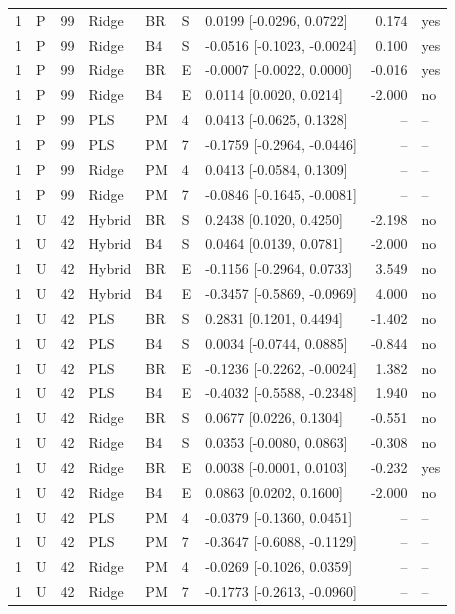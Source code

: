 \documentclass[10pt,a4paper]{article}
\begin{document}
\begin{longtable}{rlrllllrl}
1 & P & 99 & Ridge & BR & S & 0.0199 [-0.0296, 0.0722] & 0.174 & yes \\
1 & P & 99 & Ridge & B4 & S & -0.0516 [-0.1023, -0.0024] & 0.100 & yes \\
1 & P & 99 & Ridge & BR & E & -0.0007 [-0.0022, 0.0000] & -0.016 & yes \\
1 & P & 99 & Ridge & B4 & E & 0.0114 [0.0020, 0.0214] & -2.000 & no \\
1 & P & 99 & PLS & PM & 4 & 0.0413 [-0.0625, 0.1328] & -- & -- \\
1 & P & 99 & PLS & PM & 7 & -0.1759 [-0.2964, -0.0446] & -- & -- \\
1 & P & 99 & Ridge & PM & 4 & 0.0413 [-0.0584, 0.1309] & -- & -- \\
1 & P & 99 & Ridge & PM & 7 & -0.0846 [-0.1645, -0.0081] & -- & -- \\
1 & U & 42 & Hybrid & BR & S & 0.2438 [0.1020, 0.4250] & -2.198 & no \\
1 & U & 42 & Hybrid & B4 & S & 0.0464 [0.0139, 0.0781] & -2.000 & no \\
1 & U & 42 & Hybrid & BR & E & -0.1156 [-0.2964, 0.0733] & 3.549 & no \\
1 & U & 42 & Hybrid & B4 & E & -0.3457 [-0.5869, -0.0969] & 4.000 & no \\
1 & U & 42 & PLS & BR & S & 0.2831 [0.1201, 0.4494] & -1.402 & no \\
1 & U & 42 & PLS & B4 & S & 0.0034 [-0.0744, 0.0885] & -0.844 & no \\
1 & U & 42 & PLS & BR & E & -0.1236 [-0.2262, -0.0024] & 1.382 & no \\
1 & U & 42 & PLS & B4 & E & -0.4032 [-0.5588, -0.2348] & 1.940 & no \\
1 & U & 42 & Ridge & BR & S & 0.0677 [0.0226, 0.1304] & -0.551 & no \\
1 & U & 42 & Ridge & B4 & S & 0.0353 [-0.0080, 0.0863] & -0.308 & no \\
1 & U & 42 & Ridge & BR & E & 0.0038 [-0.0001, 0.0103] & -0.232 & yes \\
1 & U & 42 & Ridge & B4 & E & 0.0863 [0.0202, 0.1600] & -2.000 & no \\
1 & U & 42 & PLS & PM & 4 & -0.0379 [-0.1360, 0.0451] & -- & -- \\
1 & U & 42 & PLS & PM & 7 & -0.3647 [-0.6088, -0.1129] & -- & -- \\
1 & U & 42 & Ridge & PM & 4 & -0.0269 [-0.1026, 0.0359] & -- & -- \\
1 & U & 42 & Ridge & PM & 7 & -0.1773 [-0.2613, -0.0960] & -- & -- \\

\end{longtable}
\end{document}
